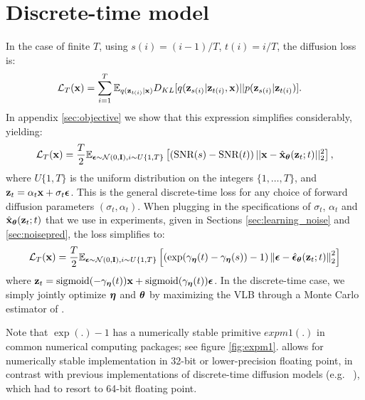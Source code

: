 \documentclass{article}
\newcommand{\lT}{\mathcal{L}_T(\rvx)}
\begin{document}
%

%
%
%

\section{Discrete-time model}

In the case of finite $T$, using $s(i) = (i-1)/T$, $t(i) = i/T$, the diffusion loss is:
\begin{align}
    \lT
    &= 
    \sum_{i=1}^T
    \E_{q(\rvz_{t(i)}|\rvx)} 
    D_{KL}[q(\rvz_{s(i)}|\rvz_{t(i)},\rvx)||p(\rvz_{s(i)}|\rvz_{t(i)})].
    \label{eq:main_finite_ELBO}
\end{align}
In appendix \ref{sec:objective} we show that this expression simplifies considerably, yielding:
\begin{align}
\lT =
\frac{T}{2}
\E_{\bepsilon \sim \mathcal{N}(0,\bfI), i \sim U\{1, T\}}
\left[
\left(\text{SNR}(s)-\text{SNR}(t)\right)
||\rvx - \hat{\rvx}_{\bT}(\rvz_t;t) ||_2^2
\right],
\label{eq:lT_main}\end{align}
where $U\{1, T\}$ is the uniform distribution on the integers $\{1,\ldots,T\}$, and ${\mathbf{z}}_t = \alpha_t {\mathbf{x}} + \sigma_t {\boldsymbol{\epsilon}}$. This is the general discrete-time loss for any choice of forward diffusion parameters $(\sigma_t,  \alpha_t)$.  When plugging in the specifications of $\sigma_t$, $\alpha_t$ and $\hat{{\mathbf{x}}}_{{\boldsymbol{\theta}}}({\mathbf{z}}_t; t)$ that we use in experiments, given in Sections \ref{sec:learning_noise} and \ref{sec:noisepred}, the loss simplifies to:
\begin{align}
\lT =
\frac{T}{2}
\E_{\bepsilon \sim \mathcal{N}(0,\bfI), i \sim U\{1, T\}}
\left[
(\exp(\gamma_{\boldeta}(t)-\gamma_{\boldeta}(s))-1)
\left\lVert\bepsilon - \hat{\bepsilon}_{\bT}(\rvz_t; t) \right\lVert_2^2
\right]
\label{eq:discrete}\end{align}
where ${\mathbf{z}}_t = \text{sigmoid}(-\gamma_{{\boldsymbol{\eta}}}(t)) {\mathbf{x}} + \text{sigmoid}(\gamma_{{\boldsymbol{\eta}}}(t)) {\boldsymbol{\epsilon}}$. 
In the discrete-time case, we simply jointly optimize ${\boldsymbol{\eta}}$ and ${\boldsymbol{\theta}}$ by maximizing the VLB through a Monte Carlo estimator of .

Note that $\exp(.)-1$ has a numerically stable primitive $expm1(.)$ in common numerical computing packages; see figure \ref{fig:expm1}.  allows for numerically stable implementation in 32-bit or lower-precision floating point, in contrast with previous implementations of discrete-time diffusion models (e.g. ~\citep{ho2020denoising}), which had to resort to 64-bit floating point. 
\end{document}
